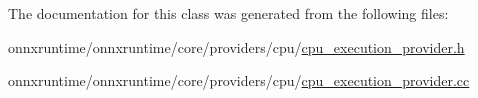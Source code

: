 The documentation for this class was generated from the following files\+:\begin{DoxyCompactItemize}
\item 
onnxruntime/onnxruntime/core/providers/cpu/\mbox{\hyperlink{cpu__execution__provider_8h}{cpu\+\_\+execution\+\_\+provider.\+h}}\item 
onnxruntime/onnxruntime/core/providers/cpu/\mbox{\hyperlink{cpu__execution__provider_8cc}{cpu\+\_\+execution\+\_\+provider.\+cc}}\end{DoxyCompactItemize}
